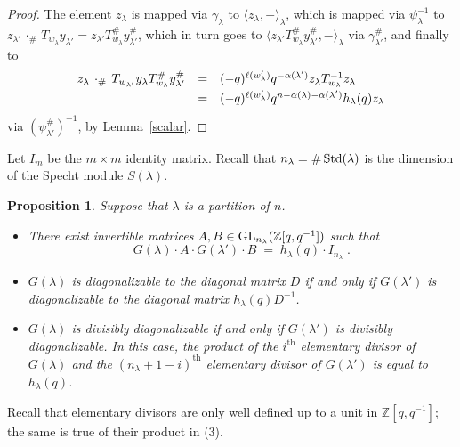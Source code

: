 \documentclass[twoside]{amsart}
\def\th{{\text{th}}}
\numberwithin{equation}{section}
\newtheorem{Proposition}[equation]{Proposition}
\theoremstyle{remark}
\let\>\rangle
\let\<\langle
\def\GL{\mathop{\rm GL}\nolimits}
\def\Z{{\mathbb Z}}
\def\len(#1){\ell(#1)}
\def\Std{\operatorname{\rm Std}}
\begin{document}
\begin{proof}
The element $z_\lambda$ is mapped via $\gamma_\lambda$ to $\< z_\lambda , -\>_\lambda$, which is mapped via 
$\psi_\lambda^{-1}$ to $z_{\lambda'}\,\cdot_\#\, T_{w_\lambda} y_{\lambda'} = z_{\lambda'} T_{w_\lambda}^\# y_{\lambda'}^\#$, which in turn
goes to $\< z_{\lambda'} T_{w_\lambda}^\# y_{\lambda'}^\# , -\>_\lambda$ via $\gamma_{\lambda'}^\#$, and finally to 
\[
\begin{array}{rcl}
z_\lambda\,\cdot_\#\, T_{w_{\lambda'}} y_\lambda T_{w_\lambda}^\# y_{\lambda'}^\#  
& = & (-q)^{\len(w_{\lambda'})} q^{-\alpha(\lambda')} z_\lambda T_{w_\lambda}^{-1} z_\lambda \vspace{1mm}\\
& = & (-q)^{\len(w_{\lambda'})} q^{n - \alpha(\lambda) - \alpha(\lambda')} h_\lambda(q) z_\lambda \\
\end{array}
\]
via $(\psi_{\lambda'}^\#)^{-1}$, by Lemma~\ref{scalar}.
\end{proof}

Let $I_m$ be the $m\times m$ identity matrix. Recall that
$n_\lambda=\#\Std(\lambda)$ is the dimension of the Specht module
$S(\lambda)$.

\begin{Proposition} 
\label{CorDiagbar}
Suppose that $\lambda$ is a partition of $n$.
\\\vspace*{-4mm}
\begin{itemize}
\item[(1)] There exist invertible matrices $A,B\in\GL_{n_\lambda}(\Z[q,q^{-1}])$ 
such that 
\[
G(\lambda)\cdot A \cdot G(\lambda')\cdot  B \; =\; h_\lambda(q)\cdot I_{n_{\lambda}}\; .
\] 
\item[(2)] $G(\lambda)$ is diagonalizable to the diagonal matrix $D$ if and only if $G(\lambda')$ is diagonalizable to the diagonal matrix $h_\lambda(q) D^{-1}$.
\item[(3)] $G(\lambda)$ is divisibly diagonalizable if and only if $G(\lambda')$ is divisibly diagonalizable. In this case, the product of the $i^\th$ 
elementary divisor of $G(\lambda)$ and the $(n_\lambda + 1 - i)^\th$ elementary divisor of $G(\lambda')$ is equal to $h_\lambda(q)$.
\end{itemize}
\end{Proposition}

Recall that elementary divisors are only well defined up to a unit in
$\Z[q,q^{-1}]$; the same is true of their product in (3).
\end{document}
